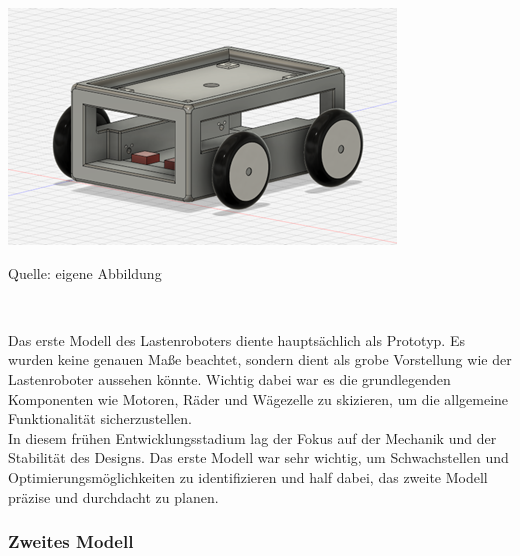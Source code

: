 \documentclass[ngerman,12pt,a4paper]{article}
\begin{document}
			\begin{center} 
				\begin{minipage}[t]{0.7\textwidth}
					\includegraphics{Pictures/modell-1}
					\label{fig:Modell-1}
					\vspace{-10pt}
					\begin{center}
						\par\small Quelle: eigene Abbildung 
					\end{center}
				\end{minipage} \\[1cm]
			\end{center}
		Das erste Modell des Lastenroboters diente hauptsächlich als Prototyp. Es wurden keine genauen Maße beachtet, sondern dient als grobe Vorstellung wie der Lastenroboter aussehen könnte. Wichtig dabei war es die grundlegenden Komponenten wie Motoren, Räder und Wägezelle zu skizieren, um die allgemeine Funktionalität sicherzustellen. \\[0.5cm]
		In diesem frühen Entwicklungsstadium lag der Fokus auf der Mechanik und der Stabilität des Designs. Das erste Modell war sehr wichtig, um Schwachstellen und Optimierungsmöglichkeiten zu identifizieren und half dabei, das zweite Modell präzise und durchdacht zu planen.
		
		\newpage
		
		\subsubsection*{Zweites Modell}	
		
\end{document}
